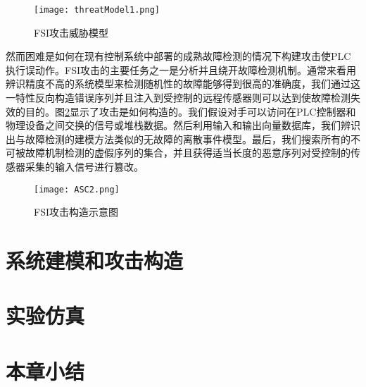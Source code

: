 \begin{figure}[!htb]
  \centering
  \texttt{[image: threatModel1.png]}
  \caption{FSI攻击威胁模型}
  \label{fig1}
\end{figure}

然而困难是如何在现有控制系统中部署的成熟故障检测的情况下构建攻击使PLC执行误动作。FSI攻击的主要任务之一是分析并且绕开故障检测机制。通常来看用辨识精度不高的系统模型来检测随机性的故障能够得到很高的准确度，我们通过这一特性反向构造错误序列并且注入到受控制的远程传感器则可以达到使故障检测失效的目的。图\ref {fig2}显示了攻击是如何构造的。我们假设对手可以访问在PLC控制器和物理设备之间交换的信号或堆栈数据。然后利用输入和输出向量数据库，我们辨识出与故障检测的建模方法类似的无故障的离散事件模型。最后，我们搜索所有的不可被故障机制检测的虚假序列的集合，并且获得适当长度的恶意序列对受控制的传感器采集的输入信号进行篡改。

\begin{figure}[!htb]
  \centering
  \texttt{[image: ASC2.png]}
  \caption{FSI攻击构造示意图}
  \label{fig2}
\end{figure}

\section{系统建模和攻击构造}
\label{sec:model}


\section{实验仿真}
\label{sec:simulation}

\section{本章小结}
\label{sec:insertimage}


